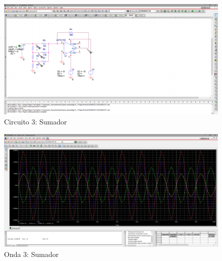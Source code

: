 \documentclass[letterpaper]{article}
\begin{document}
\begin{figure}[htbp]
    \centering
    \includegraphics[width=18cm]{IMG/cir(3).png}
    \caption{Circuito 3: Sumador}
    \label{fig:my_label}
\end{figure}
\begin{figure}[htbp]
    \centering
    \includegraphics[width=18cm]{IMG/ond(3).png}
    \caption{Onda 3: Sumador}
    \label{fig:my_label}
\end{figure}
\end{document}
